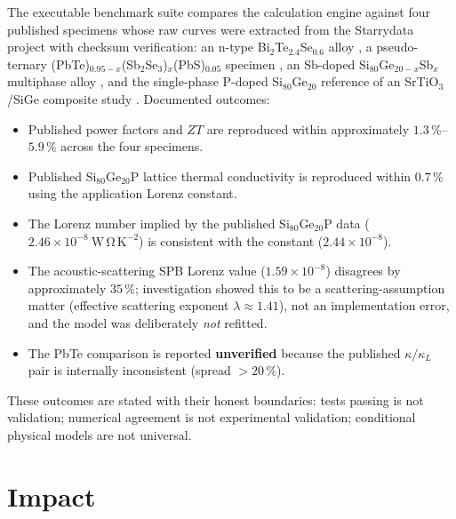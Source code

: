 \documentclass[preprint,12pt, a4paper]{elsarticle}
\begin{document}
The executable benchmark suite compares the calculation engine against four
published specimens whose raw curves were extracted from the Starrydata
project \cite{katsura2025} with checksum verification: an n-type
Bi$_{2}$Te$_{2.4}$Se$_{0.6}$ alloy \cite{huang2019}, a pseudo-ternary
(PbTe)$_{0.95-x}$(Sb$_{2}$Se$_{3}$)$_{x}$(PbS)$_{0.05}$ specimen
\cite{zhang2020}, an Sb-doped Si$_{80}$Ge$_{20-x}$Sb$_{x}$ multiphase alloy
\cite{wang2015}, and the single-phase P-doped Si$_{80}$Ge$_{20}$ reference of
an SrTiO$_{3}$/SiGe composite study \cite{wang2020srtio3}. Documented
outcomes:

\begin{itemize}
  \item Published power factors and $ZT$ are reproduced within approximately
        $1.3\,\%$--$5.9\,\%$ across the four specimens.
  \item Published Si$_{80}$Ge$_{20}$P lattice thermal conductivity is
        reproduced within $0.7\,\%$ using the application Lorenz constant.
  \item The Lorenz number implied by the published
        Si$_{80}$Ge$_{20}$P data ($2.46\times10^{-8}\
        \mathrm{W\,\Omega\,K^{-2}}$) is consistent with the constant
        ($2.44\times10^{-8}$).
  \item The acoustic-scattering SPB Lorenz value ($1.59\times10^{-8}$)
        disagrees by approximately $35\,\%$; investigation showed this to be a
        scattering-assumption matter (effective scattering exponent
        $\lambda \approx 1.41$), not an implementation error, and the model was
        deliberately \emph{not} refitted.
  \item The PbTe comparison is reported \textbf{unverified} because the
        published $\kappa/\kappa_{L}$ pair is internally inconsistent (spread
        $>20\,\%$).
\end{itemize}

These outcomes are stated with their honest boundaries: tests passing is not
validation; numerical agreement is not experimental validation; conditional
physical models are not universal.


\section{Impact}
\label{sec:impact}
\end{document}
